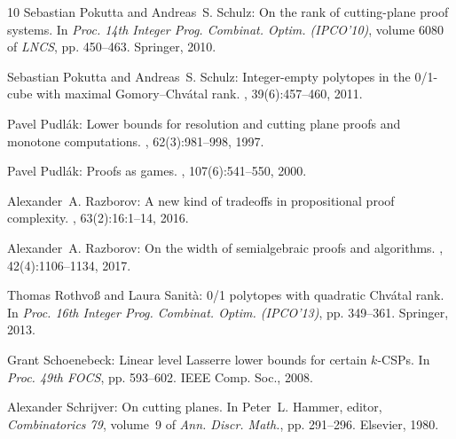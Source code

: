 \documentclass[11pt]{article}
\begin{document}
\begin{thebibliography}{10}
{\sc Sebastian Pokutta and Andreas~S. Schulz}: On the rank of cutting-plane
  proof systems.
\newblock In {\em Proc. 14th Integer Prog. Combinat. Optim. (IPCO'10)}, volume
  6080 of {\em LNCS}, pp. 450--463. Springer, 2010.
\newblock [\epfmtdoi{10.1007/978-3-642-13036-6\_34}]

{\sc Sebastian Pokutta and Andreas~S. Schulz}: Integer-empty polytopes in the
  0/1-cube with maximal {G}omory--{C}hv{\'{a}}tal rank.
, 39(6):457--460, 2011.

{\sc Pavel Pudl{\'{a}}k}: Lower bounds for resolution and cutting plane proofs
  and monotone computations.
, 62(3):981--998, 1997.
\newblock [\epfmtdoi{10.2307/2275583}]

{\sc Pavel Pudl{\'a}k}: Proofs as games.
, 107(6):541--550, 2000.
\newblock [\epfmtdoi{10.1080/00029890.2000.12005233}]

{\sc Alexander~A. Razborov}: A new kind of tradeoffs in propositional proof
  complexity.
, 63(2):16:1--14, 2016.
\newblock [\epfmtdoi{10.1145/2858790}]

{\sc Alexander~A. Razborov}: On the width of semialgebraic proofs and
  algorithms.
, 42(4):1106--1134, 2017.

{\sc Thomas Rothvo{\ss} and Laura Sanit{\`a}}: 0/1 polytopes with quadratic
  {C}hv{\'a}tal rank.
\newblock In {\em Proc. 16th Integer Prog. Combinat. Optim. (IPCO'13)}, pp.
  349--361. Springer, 2013.
\newblock [\epfmtdoi{10.1007/978-3-642-36694-9\_30}]

{\sc Grant Schoenebeck}: Linear level {L}asserre lower bounds for certain
  $k$-{CSPs}.
\newblock In {\em Proc. 49th FOCS}, pp. 593--602. IEEE Comp. Soc., 2008.

{\sc Alexander Schrijver}: On cutting planes.
\newblock In {\sc Peter~L. Hammer}, editor, {\em Combinatorics 79}, volume~9 of
  {\em Ann. Discr. Math.}, pp. 291--296. Elsevier, 1980.
\newblock [\epfmtdoi{10.1016/S0167-5060(08)70085-2}]

\end{thebibliography}
\end{document}
